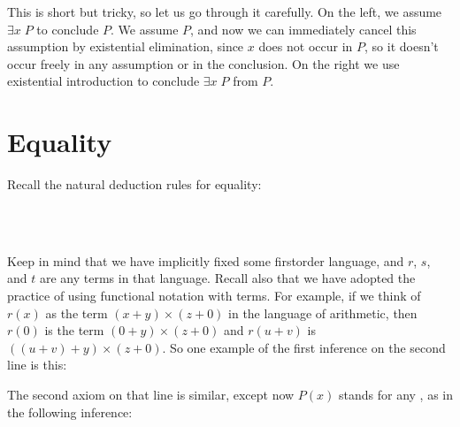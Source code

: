 \documentclass[letterpaper,10pt,english]{sphinxmanual}
\begin{document}
\sphinxAtStartPar
This is short but tricky, so let us go through it carefully. On the left, we assume \(\exists x \; P\) to conclude \(P\). We assume \(P\), and now we can immediately cancel this assumption by existential elimination, since \(x\) does not occur in \(P\), so it doesn’t occur freely in any assumption or in the conclusion. On the right we use existential introduction to conclude \(\exists x \; P\) from \(P\).


\section{Equality}
\label{\detokenize{natural_deduction_for_first_order_logic:equality}}\label{\detokenize{natural_deduction_for_first_order_logic:id1}}
\sphinxAtStartPar
Recall the natural deduction rules for equality:



\begin{center}
\AXM{}
\DP
\quad
{}
\DP
\quad
{}
\DP
\\
\ \\
\DP
\quad
{}
\DP
\end{center}

\sphinxAtStartPar
Keep in mind that we have implicitly fixed some first\sphinxhyphen{}order language, and \(r\), \(s\), and \(t\) are any terms in that language. Recall also that we have adopted the practice of using functional notation with terms. For example, if we think of \(r(x)\) as the term \((x + y) \times (z + 0)\) in the language of arithmetic, then \(r(0)\) is the term \((0 + y) \times (z + 0)\) and \(r(u + v)\) is \(((u + v) + y) \times (z + 0)\). So one example of the first inference on the second line is this:



\begin{center}
\DP
\end{center}

\sphinxAtStartPar
The second axiom on that line is similar, except now \(P(x)\) stands for any , as in the following inference:



\begin{center}
\DP
\end{center}
\end{document}
